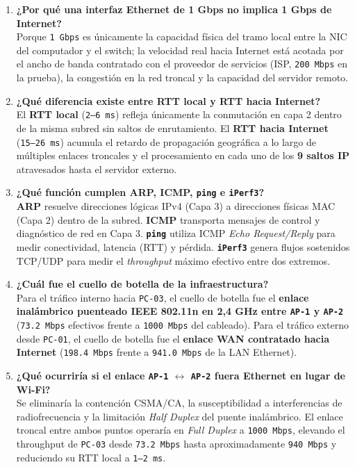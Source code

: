 \documentclass[11pt, a4paper]{article}
\begin{document}
\begin{enumerate}
    \item \textbf{¿Por qué una interfaz Ethernet de 1 Gbps no implica 1 Gbps de Internet?} \\
    Porque \texttt{1 Gbps} es únicamente la capacidad física del tramo local entre la NIC del computador y el switch; la velocidad real hacia Internet está acotada por el ancho de banda contratado con el proveedor de servicios (ISP, \texttt{200 Mbps} en la prueba), la congestión en la red troncal y la capacidad del servidor remoto.
    \item \textbf{¿Qué diferencia existe entre RTT local y RTT hacia Internet?} \\
    El \textbf{RTT local} (\texttt{2--6 ms}) refleja únicamente la conmutación en capa 2 dentro de la misma subred sin saltos de enrutamiento. El \textbf{RTT hacia Internet} (\texttt{15--26 ms}) acumula el retardo de propagación geográfica a lo largo de múltiples enlaces troncales y el procesamiento en cada uno de los \textbf{9 saltos IP} atravesados hasta el servidor externo.
    \item \textbf{¿Qué función cumplen ARP, ICMP, \texttt{ping} e \texttt{iPerf3}?} \\
    \textbf{ARP} resuelve direcciones lógicas IPv4 (Capa 3) a direcciones físicas MAC (Capa 2) dentro de la subred. \textbf{ICMP} transporta mensajes de control y diagnóstico de red en Capa 3. \textbf{\texttt{ping}} utiliza ICMP \textit{Echo Request/Reply} para medir conectividad, latencia (RTT) y pérdida. \textbf{\texttt{iPerf3}} genera flujos sostenidos TCP/UDP para medir el \textit{throughput} máximo efectivo entre dos extremos.
    \item \textbf{¿Cuál fue el cuello de botella de la infraestructura?} \\
    Para el tráfico interno hacia \texttt{PC-03}, el cuello de botella fue el \textbf{enlace inalámbrico puenteado IEEE 802.11n en 2,4 GHz entre \texttt{AP-1} y \texttt{AP-2}} (\texttt{73.2 Mbps} efectivos frente a \texttt{1000 Mbps} del cableado). Para el tráfico externo desde \texttt{PC-01}, el cuello de botella fue el \textbf{enlace WAN contratado hacia Internet} (\texttt{198.4 Mbps} frente a \texttt{941.0 Mbps} de la LAN Ethernet).
    \item \textbf{¿Qué ocurriría si el enlace \texttt{AP-1} $\leftrightarrow$ \texttt{AP-2} fuera Ethernet en lugar de Wi-Fi?} \\
    Se eliminaría la contención CSMA/CA, la susceptibilidad a interferencias de radiofrecuencia y la limitación \textit{Half Duplex} del puente inalámbrico. El enlace troncal entre ambos puntos operaría en \textit{Full Duplex} a \texttt{1000 Mbps}, elevando el throughput de \texttt{PC-03} desde \texttt{73.2 Mbps} hasta aproximadamente \texttt{940 Mbps} y reduciendo su RTT local a \texttt{1--2 ms}.
\end{enumerate}
\end{document}
